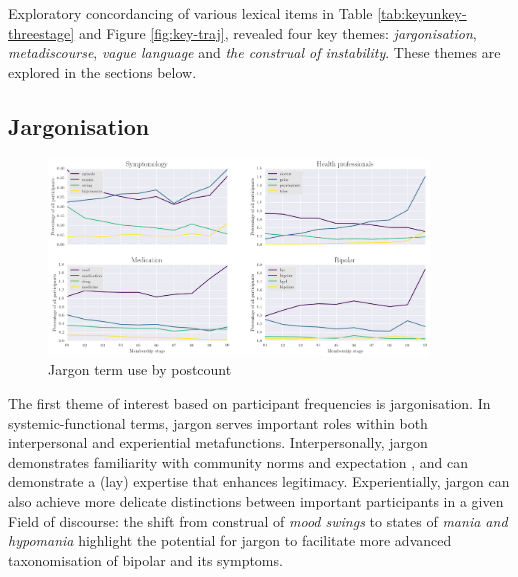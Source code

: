 Exploratory concordancing of various lexical items in Table \ref{tab:keyunkey-threestage} and Figure \ref{fig:key-traj}, revealed four key \glspl{theme}: \emph{jargonisation}, \emph{metadiscourse}, \emph{vague language} and \emph{the construal of instability}. These \glspl{theme} are explored in the sections below. 

\subsection{Jargonisation} \label{sect:jargon}

\begin{figure}[htb]
    \begin{center}
    \includegraphics[width=0.90\textwidth]{../images/better_jargon.png}
    \end{center}
    \caption{Jargon term use by postcount}
    \label{fig:jargon}
    \end{figure}

The first theme of interest based on participant frequencies is jargonisation. In systemic\hyp{}functional terms, jargon serves important roles within both interpersonal and experiential metafunctions. Interpersonally, jargon demonstrates familiarity with community norms and expectation \cite{martin_language_2005}, and can demonstrate a (lay) expertise that enhances legitimacy. Experientially, jargon can also achieve more delicate distinctions between important participants in a given Field of discourse: the shift from construal of \emph{mood swings} to states of \emph{mania and hypomania} highlight the potential for jargon to facilitate more advanced taxonomisation of \gls{bipolar} and its symptoms.

